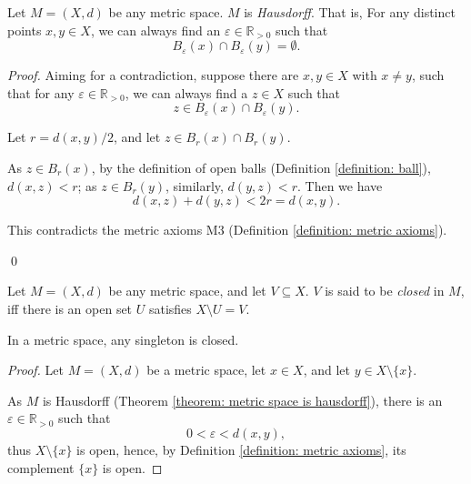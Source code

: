 \begin{theorem}
	\label{theorem: metric space is hausdorff}
	Let $M = (X, d)$ be any metric space. $M$ is \textit{Hausdorff}. That is, For any distinct points $x,y \in X$, we can always find an $\varepsilon \in \mathbb R_{> 0}$ such that
	$$
	B_\varepsilon(x) \cap B_\varepsilon(y) = \emptyset.
	$$
	
	\begin{proof}
		Aiming for a contradiction, suppose there are $x,y \in X$ with $x \ne y$, such that for any $\varepsilon \in \mathbb R_{> 0}$, we can always find a $z \in X$ such that
		$$
		z \in B_\varepsilon(x) \cap B_\varepsilon(y).
		$$
		
		Let $r = d(x,y)/2$, and let $z \in B_r(x) \cap B_r(y)$.
		
		As $z \in B_r(x)$, by the definition of open balls (Definition \ref{definition: ball}), $d(x,z) < r$; as $z \in B_r(y)$, similarly, $d(y,z)< r$. Then we have
		$$
		d(x, z) + d(y, z) < 2r = d(x,y).
		$$
		
		This contradicts the metric axioms M3 (Definition \ref{definition: metric axioms}).
		
		\qed
	\end{proof}
\end{theorem}


\begin{definition}
	\label{definition: closed set in metric space}
	Let $M = (X, d)$ be any metric space, and let $V \subseteq X$. $V$ is said to be \textit{closed} in $M$, iff there is an open set $U$ satisfies $X \setminus U = V$.
\end{definition}


\begin{lemma}
	\label{lemma: singleton in metric space is closed}
	In a metric space, any singleton is closed.
	
	\begin{proof}
		Let $M=(X, d)$ be a metric space, let $x \in X$, and let $y \in X \setminus \{x\}$.
		
		As $M$ is Hausdorff (Theorem \ref{theorem: metric space is hausdorff}), there is an $\varepsilon \in \mathbb R_{> 0}$ such that
		$$
		0 < \varepsilon < d(x,y),
		$$
		thus $X \setminus \{x\}$ is open, hence, by Definition \ref{definition: metric axioms}, its complement $\{x\}$ is open.
		
		\qedlemma
	\end{proof}
\end{lemma}


